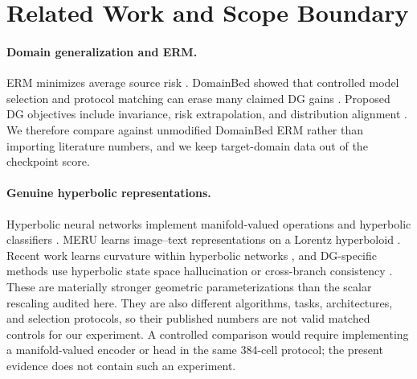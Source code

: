\documentclass[10pt]{article}
\begin{document}
\section{Related Work and Scope Boundary}
\label{sec:related}

\paragraph{Domain generalization and ERM.}
ERM minimizes average source risk \citep{vapnik1998statistical}. DomainBed
showed that controlled model selection and protocol matching can erase many
claimed DG gains \citep{gulrajani2021insearch}. Proposed DG objectives include
invariance, risk extrapolation, and distribution alignment
\citep{arjovsky2019invariant,krueger2021out,sun2016deep}. We therefore compare
against unmodified DomainBed ERM rather than importing literature numbers, and
we keep target-domain data out of the checkpoint score.

\paragraph{Genuine hyperbolic representations.}
Hyperbolic neural networks implement manifold-valued operations and
hyperbolic classifiers \citep{ganea2018hyperbolic}. MERU learns image--text
representations on a Lorentz hyperboloid \citep{desai2023meru}. Recent work
learns curvature within hyperbolic networks
\citep{fan2025curvaturelearning}, and DG-specific methods use hyperbolic state
space hallucination or cross-branch consistency
\citep{bi2025hyperbolic,disalvo2026hypcbc}. These are materially stronger
geometric parameterizations than the scalar rescaling audited here. They are
also different algorithms, tasks, architectures, and selection protocols, so
their published numbers are not valid matched controls for our experiment.
A controlled comparison would require implementing a manifold-valued encoder
or head in the same 384-cell protocol; the present evidence does not contain
such an experiment.
\end{document}

